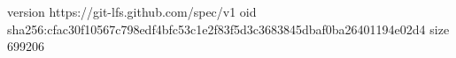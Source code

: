 version https://git-lfs.github.com/spec/v1
oid sha256:cfac30f10567c798edf4bfc53c1e2f83f5d3c3683845dbaf0ba26401194e02d4
size 699206

